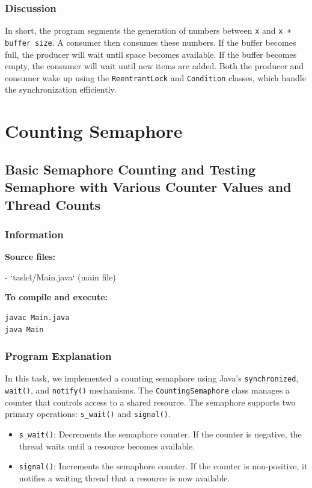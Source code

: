 \documentclass{article}
\begin{document}
\subsubsection{Discussion}
In short, the program segments the generation of numbers between \texttt{x} and \texttt{x + buffer size}. A consumer then consumes these numbers. If the buffer becomes full, the producer will wait until space becomes available. If the buffer becomes empty, the consumer will wait until new items are added. Both the producer and consumer wake up using the \texttt{ReentrantLock} and \texttt{Condition} classes, which handle the synchronization efficiently.



\newpage
\section{Counting Semaphore}

\subsection{Basic Semaphore Counting and Testing Semaphore with Various Counter Values and Thread Counts}

\subsubsection{Information}
\textbf{Source files:}

- `task4/Main.java` (main file)

\textbf{To compile and execute:}
\begin{lstlisting}[style=bash]
javac Main.java
java Main
\end{lstlisting}

\subsubsection{Program Explanation}
In this task, we implemented a counting semaphore using Java's \texttt{synchronized}, \texttt{wait()}, and \texttt{notify()} mechanisms. The \texttt{CountingSemaphore} class manages a counter that controls access to a shared resource. The semaphore supports two primary operations: \texttt{s\_wait()} and \texttt{signal()}.

\begin{itemize}
    \item \texttt{s\_wait()}: Decrements the semaphore counter. If the counter is negative, the thread waits until a resource becomes available.
    \item \texttt{signal()}: Increments the semaphore counter. If the counter is non-positive, it notifies a waiting thread that a resource is now available.
\end{itemize}
\end{document}
